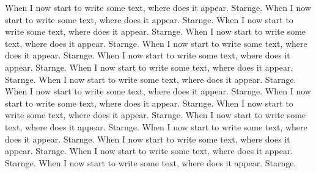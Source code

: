 When I now start to write some text, where does it appear. Starnge.
When I now start to write some text, where does it appear. Starnge.
When I now start to write some text, where does it appear. Starnge.
When I now start to write some text, where does it appear. Starnge.
When I now start to write some text, where does it appear. Starnge.
When I now start to write some text, where does it appear. Starnge.
When I now start to write some text, where does it appear. Starnge.
When I now start to write some text, where does it appear. Starnge.
When I now start to write some text, where does it appear. Starnge.
When I now start to write some text, where does it appear. Starnge.
When I now start to write some text, where does it appear. Starnge.
When I now start to write some text, where does it appear. Starnge.
When I now start to write some text, where does it appear. Starnge.
When I now start to write some text, where does it appear. Starnge.
When I now start to write some text, where does it appear. Starnge.
When I now start to write some text, where does it appear. Starnge.

